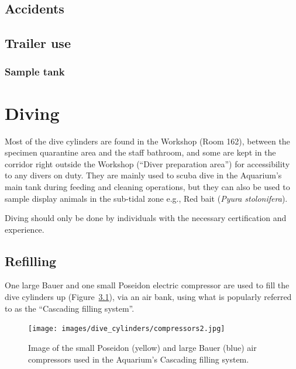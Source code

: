 \documentclass[
  12pt,
]{report}
\begin{document}
\hypertarget{accidents}{%
\section{Accidents}\label{accidents}}

\hypertarget{trailer-use}{%
\section{Trailer use}\label{trailer-use}}

\hypertarget{sec-sam-tank}{%
\subsection{Sample tank}\label{sec-sam-tank}}

\newpage

\hypertarget{diving}{%
\chapter{Diving}\label{diving}}

Most of the dive cylinders are found in the Workshop (Room 162), between
the specimen quarantine area and the staff bathroom, and some are kept
in the corridor right outside the Workshop (``Diver preparation area'')
for accessibility to any divers on duty. They are mainly used to scuba
dive in the Aquarium's main tank during feeding and cleaning operations,
but they can also be used to sample display animals in the sub-tidal
zone e.g., Red bait (\emph{Pyura stolonifera}).

{Diving should only be done by individuals with the necessary
certification and experience}.

\hypertarget{refilling}{%
\section{Refilling}\label{refilling}}

One large Bauer and one small Poseidon electric compressor are used to
fill the dive cylinders up (Figure~\ref{fig-compressors}), via an air
bank, using what is popularly referred to as the ``Cascading filling
system''.

\begin{figure}[H]

{\centering \texttt{[image: images/dive\_cylinders/compressors2.jpg]}

}

\caption{\label{fig-compressors}Image of the small Poseidon (yellow) and
large Bauer (blue) air compressors used in the Aquarium's Cascading
filling system.}

\end{figure}
\end{document}
